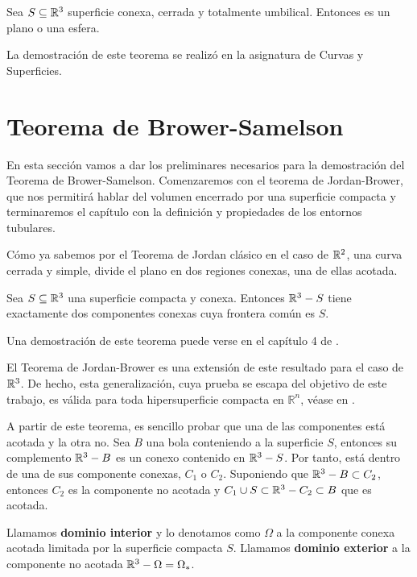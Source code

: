 \begin{theorem}\label{umbilicaltheorem}
Sea $S \subseteq \mathbb{R}^3$ superficie conexa, cerrada y totalmente umbilical. Entonces es un plano o una esfera.
\end{theorem}

La demostración de este teorema se realizó en la asignatura de Curvas y Superficies.

\section{Teorema de Brower-Samelson}

En esta sección vamos a dar los preliminares necesarios para la demostración del Teorema de Brower-Samelson. Comenzaremos con el teorema de Jordan-Brower, que nos permitirá hablar del volumen encerrado por una superficie compacta y terminaremos el capítulo con la definición y propiedades de los entornos tubulares.

Cómo ya sabemos por el Teorema de Jordan clásico en el caso de $\mathbb{R}^2$, una curva cerrada y simple, divide el plano en dos regiones conexas, una de ellas acotada.

\begin{theorem}
Sea $S \subseteq \mathbb{R}^3$ una superficie compacta y conexa. Entonces $\mathbb{R}^3 - S$ tiene exactamente dos componentes conexas cuya frontera común es $S$.
\end{theorem}

Una demostración de este teorema puede verse en el capítulo 4 de \cite{montielrosbook}.

El Teorema de Jordan-Brower es una extensión de este resultado para el caso de $\mathbb{R}^3$. De hecho, esta generalización, cuya prueba se escapa del objetivo de este trabajo, es válida para toda hipersuperficie compacta en $\mathbb{R}^n$, véase en \cite{paperchicago}.

A partir de este teorema, es sencillo probar que una de las componentes está acotada y la otra no. Sea $B$ una bola conteniendo a la superficie $S$, entonces su complemento $\mathbb{R}^3 - B$ es un conexo contenido en $\mathbb{R}^3 - S$. Por tanto, está dentro de una de sus componente conexas, $C_1$ o $C_2$. Suponiendo que $\mathbb{R}^3 - B \subset C_2$, entonces $C_2$ es la componente no acotada y $C_1 \cup S \subset \mathbb{R}^3 - C_2 \subset B$ que es acotada. 

\begin{definition}
Llamamos \textbf{dominio interior} y lo denotamos como $\Omega$ a la componente conexa acotada limitada por la superficie compacta $S$. Llamamos \textbf{dominio exterior} a la componente no acotada $\mathbb{R}^3 - \Omega=\Omega_{*}$.
\end{definition}

